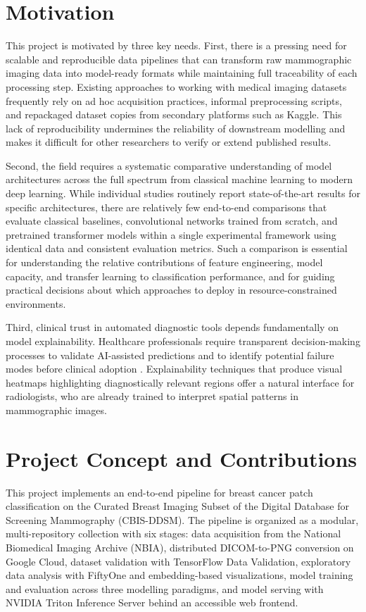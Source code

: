 \documentclass[justified,notoc,openany]{tufte-book}
\begin{document}
\section{Motivation}\label{motivation}

This project is motivated by three key needs. First, there is a pressing need for scalable and reproducible data pipelines that can transform raw mammographic imaging data into model-ready formats while maintaining full traceability of each processing step. Existing approaches to working with medical imaging datasets frequently rely on ad hoc acquisition practices, informal preprocessing scripts, and repackaged dataset copies from secondary platforms such as Kaggle. This lack of reproducibility undermines the reliability of downstream modelling and makes it difficult for other researchers to verify or extend published results.

Second, the field requires a systematic comparative understanding of model architectures across the full spectrum from classical machine learning to modern deep learning. While individual studies routinely report state-of-the-art results for specific architectures, there are relatively few end-to-end comparisons that evaluate classical baselines, convolutional networks trained from scratch, and pretrained transformer models within a single experimental framework using identical data and consistent evaluation metrics. Such a comparison is essential for understanding the relative contributions of feature engineering, model capacity, and transfer learning to classification performance, and for guiding practical decisions about which approaches to deploy in resource-constrained environments.

Third, clinical trust in automated diagnostic tools depends fundamentally on model explainability. Healthcare professionals require transparent decision-making processes to validate AI-assisted predictions and to identify potential failure modes before clinical adoption \cite{Lee2017}. Explainability techniques that produce visual heatmaps highlighting diagnostically relevant regions offer a natural interface for radiologists, who are already trained to interpret spatial patterns in mammographic images.

\section{Project Concept and Contributions}\label{project-concept-and-contributions}

This project implements an end-to-end pipeline for breast cancer patch classification on the Curated Breast Imaging Subset of the Digital Database for Screening Mammography (CBIS-DDSM). The pipeline is organized as a modular, multi-repository collection with six stages: data acquisition from the National Biomedical Imaging Archive (NBIA), distributed DICOM-to-PNG conversion on Google Cloud, dataset validation with TensorFlow Data Validation, exploratory data analysis with FiftyOne and embedding-based visualizations, model training and evaluation across three modelling paradigms, and model serving with NVIDIA Triton Inference Server behind an accessible web frontend.
\end{document}
